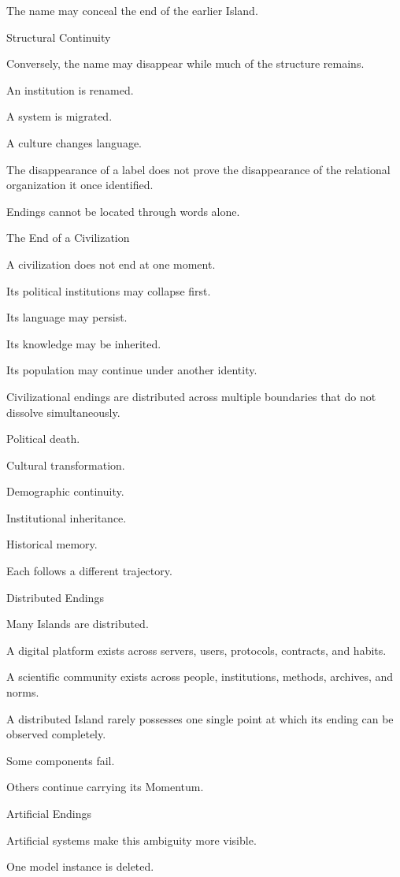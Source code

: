 The name may conceal the end of the earlier Island.

Structural Continuity

Conversely, the name may disappear while much of the structure remains.

An institution is renamed.

A system is migrated.

A culture changes language.

The disappearance of a label does not prove the disappearance of the relational organization it once identified.

Endings cannot be located through words alone.

The End of a Civilization

A civilization does not end at one moment.

Its political institutions may collapse first.

Its language may persist.

Its knowledge may be inherited.

Its population may continue under another identity.

Civilizational endings are distributed across multiple boundaries that do not dissolve simultaneously.

Political death.

Cultural transformation.

Demographic continuity.

Institutional inheritance.

Historical memory.

Each follows a different trajectory.

Distributed Endings

Many Islands are distributed.

A digital platform exists across servers, users, protocols, contracts, and habits.

A scientific community exists across people, institutions, methods, archives, and norms.

A distributed Island rarely possesses one single point at which its ending can be observed completely.

Some components fail.

Others continue carrying its Momentum.

Artificial Endings

Artificial systems make this ambiguity more visible.

One model instance is deleted.

